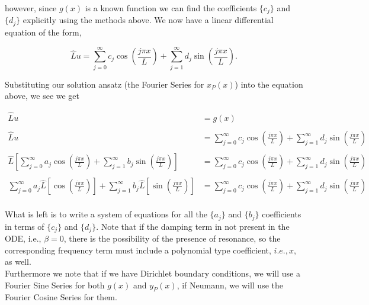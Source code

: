however, since $g(x)$ is a known function we can find the coefficients $\{ c_j \}$ and $\{ d_j \}$ explicitly using the methods above. We now have a  linear differential equation of the form,

$$\hat{L}u = \sum_{j=0}^{\infty} c_j \cos\left( \frac{j\pi x}{L} \right ) +  \sum_{j=1}^{\infty} d_j \sin\left( \frac{j\pi x}{L} \right ).$$

Substituting our solution ansatz (the Fourier Series for $x_P(x)$) into the equation above, we see we get

\begin{align*}
\hat{L}u &= g(x) \\ \\
\hat{L}u &= \sum_{j=0}^{\infty} c_j \cos\left( \frac{j\pi x}{L} \right ) +  \sum_{j=1}^{\infty} d_j \sin\left( \frac{j\pi x}{L} \right ) \\ \\
\hat{L} \left[   \sum_{j=0}^{\infty} a_j \cos\left( \frac{j\pi x}{L} \right ) +  \sum_{j=1}^{\infty} b_j \sin\left( \frac{j\pi x}{L} \right ) \right]  &= \sum_{j=0}^{\infty} c_j \cos\left( \frac{j\pi x}{L} \right ) +  \sum_{j=1}^{\infty} d_j \sin\left( \frac{j\pi x}{L} \right ) \\ \\
 \sum_{j=0}^{\infty} a_j \hat{L} \left[ \cos\left( \frac{j\pi x}{L} \right ) \right] + \sum_{j=1}^{\infty} b_j \hat{L}\left[ \sin\left( \frac{j\pi x}{L} \right ) \right] &= \sum_{j=0}^{\infty} c_j \cos\left( \frac{j\pi x}{L} \right ) +  \sum_{j=1}^{\infty} d_j \sin\left( \frac{j\pi x}{L} \right ) \\ 
\end{align*}


What is left is to write a system of equations for all the $\{a_j\}$ and $\{b_j\}$ coefficients in terms of $\{ c_j\}$ and $\{d_j\}$. Note that if the damping term in not present in the ODE, i.e., $\beta=0$, there is the possibility of the presence of resonance, so the corresponding frequency term must include a polynomial type coefficient, $i.e., x$, as well.\\  

Furthermore we note that if we have Dirichlet boundary conditions, we will use a Fourier Sine Series for both $g(x)$ and $y_P(x)$, if Neumann, we will use the Fourier Cosine Series for them. 






%
%
%
%

